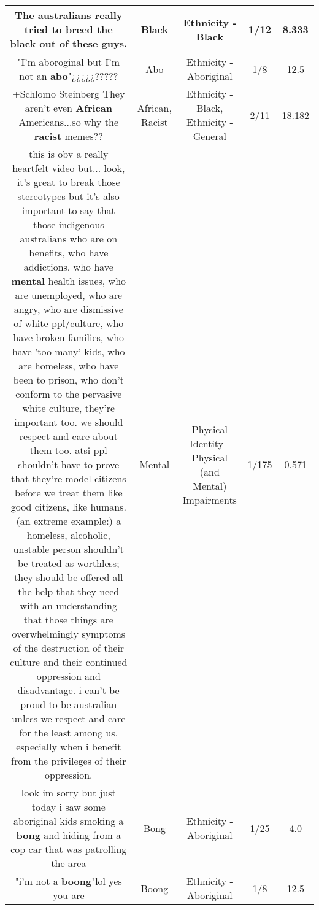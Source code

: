 \documentclass[11pt]{article}
\newlength\mylength
\begin{document}
\begin{center}
\begin{longtable}{|C{.65\mylength}|C{.30\mylength}|C{.12\mylength}|C{.12\mylength}|C{.12\mylength}|}
  \small The australians really tried to breed the \textbf{black} out of these guys.\normalsize   & Black & Ethnicity - Black & 1/12 & 8.333 \\  \hline
  \small "I'm aboroginal but I'm not an \textbf{abo}"¿¿¿¿¿?????\normalsize   & Abo & Ethnicity - Aboriginal & 1/8 & 12.5 \\  \hline
  \small +Schlomo Steinberg They aren't even \textbf{African} Americans...so why the \textbf{racist} memes??\normalsize   & African, Racist & Ethnicity - Black, Ethnicity - General & 2/11 & 18.182 \\  \hline
  \small this is obv a really heartfelt video but... look, it's great to break those stereotypes but it's also important to say that those indigenous australians who are on benefits, who have addictions, who have \textbf{mental} health issues, who are unemployed, who are angry, who are dismissive of white ppl/culture, who have broken families, who have 'too many' kids, who are homeless, who have been to prison, who don't conform to the pervasive white culture, they're important too. we should respect and care about them too. atsi ppl shouldn't have to prove that they're model citizens before we treat them like good citizens, like humans. (an extreme example:) a homeless, alcoholic, unstable person shouldn't be treated as worthless; they should be offered all the help that they need with an understanding that those things are overwhelmingly symptoms of the destruction of their culture and their continued oppression and disadvantage. i can't be proud to be australian unless we respect and care for the least among us, especially when i benefit from the privileges of their oppression.\normalsize   & Mental & Physical Identity - Physical (and Mental) Impairments & 1/175 & 0.571 \\  \hline
  \small look im sorry but just today i saw some aboriginal kids smoking a \textbf{bong} and hiding from a cop car that was patrolling the area\normalsize   & Bong & Ethnicity - Aboriginal & 1/25 & 4.0 \\  \hline
  \small "i'm not a \textbf{boong}"lol yes you are\normalsize   & Boong & Ethnicity - Aboriginal & 1/8 & 12.5 \\  \hline

\end{longtable}
\end{center}
\end{document}
